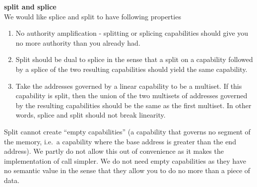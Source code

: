 \documentclass[a3paper]{article}
\begin{document}
\noindent\textbf{split and splice}\\
We would like splice and split to have following properties
\begin{enumerate}
\item No authority amplification - splitting or splicing capabilities should give you no more authority than you already had.
\item Split should be dual to splice in the sense that a split on a capability followed by a splice of the two resulting capabilities should yield the same capability.
\item Take the addresses governed by a linear capability to be a multiset. If this capability is split, then the union of the two multisets of addresses governed by the resulting capabilities should be the same as the first multiset. In other words, splice and split should not break linearity.
\end{enumerate}
Split cannot create ``empty capabilities'' (a capability that governs no segment of the memory, i.e.\ a capability where the base address is greater than the end address). We partly do not allow this out of convenience as it makes the implementation of call simpler. We do not need empty capabilities as they have no semantic value in the sense that they allow you to do no more than a piece of data.
\end{document}
